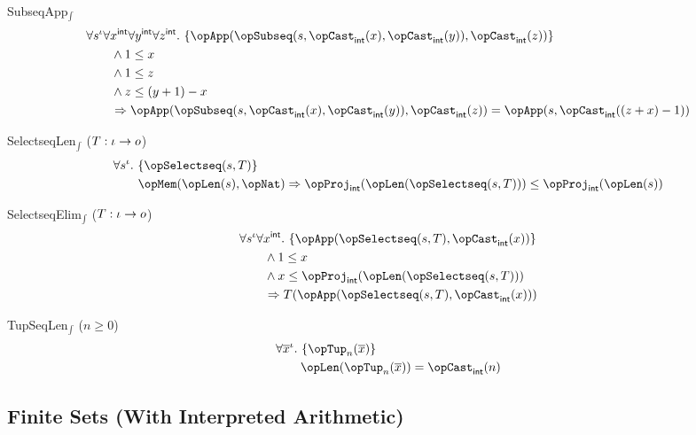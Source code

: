 \documentclass[11pt, a4paper, oneside]{article}
\begin{document}
\begin{axioms}
\item[SubseqApp$_\int$] \[
        \begin{aligned}
            &\forall s^\idv \forall x^\int \forall y^\int \forall z^\int.\, \st{ \opApp(\opSubseq(s, \opCast_\int(x), \opCast_\int(y)), \opCast_\int(z)) } \\
            &\qquad \wedge 1 \le x \\
            &\qquad \wedge 1 \le z \\
            &\qquad \wedge z \le (y + 1) - x \\
            &\qquad \imp \opApp(\opSubseq(s, \opCast_\int(x), \opCast_\int(y)), \opCast_\int(z)) = \opApp(s, \opCast_\int((z + x) - 1))
        \end{aligned}
    \]

\item[SelectseqLen$_\int$ ($T : \iota \rightarrow o$)] \[
        \begin{aligned}
            &\forall s^\idv.\, \st{ \opSelectseq(s, T) } \\
            &\qquad \opMem(\opLen(s), \opNat) \imp \opProj_\int(\opLen(\opSelectseq(s, T))) \le \opProj_\int(\opLen(s))
        \end{aligned}
    \]

\item[SelectseqElim$_\int$ ($T : \iota \rightarrow o$)] \[
        \begin{aligned}
            &\forall s^\idv \forall x^\int.\, \st{ \opApp(\opSelectseq(s, T), \opCast_\int(x)) } \\
            &\qquad \wedge 1 \le x \\
            &\qquad \wedge x \le \opProj_\int(\opLen(\opSelectseq(s, T))) \\
            &\qquad \imp T(\opApp(\opSelectseq(s, T), \opCast_\int(x)))
        \end{aligned}
    \]

\item[TupSeqLen$_\int$ ($n \ge 0$)] \[
        \begin{aligned}
            &\forall \overline{x}^\idv.\, \st{ \opTup_n(\overline{x}) } \\
            &\qquad \opLen(\opTup_n(\overline{x})) = \opCast_\int(n)
        \end{aligned}
    \]

\end{axioms}


    \subsection{Finite Sets (With Interpreted Arithmetic)}
    \label{subsec:fsets_interpreted}
\end{document}

